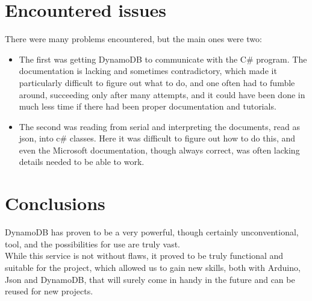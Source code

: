 \documentclass[]{article}
\begin{document}
	\section{Encountered issues}
	There were many problems encountered, but the main ones were two:
	\begin{itemize}
	\item The first was getting DynamoDB to communicate with the C\# program. The documentation is lacking and sometimes contradictory, which made it particularly difficult to figure out what to do, and one often had to fumble around, succeeding only after many attempts, and it could have been done in much less time if there had been proper documentation and tutorials.
	\item The second was reading from serial and interpreting the documents, read as json, into c\# classes. Here it was difficult to figure out how to do this, and even the Microsoft documentation, though always correct, was often lacking details needed to be able to work.
	\end{itemize}	
	\section{Conclusions}
	DynamoDB has proven to be a very powerful, though certainly unconventional, tool, and the possibilities for use are truly vast.\\
	While this service is not without flaws, it proved to be truly functional and suitable for the project, which allowed us to gain new skills, both with Arduino, Json and DynamoDB, that will surely come in handy in the future and can be reused for new projects.
\end{document}

